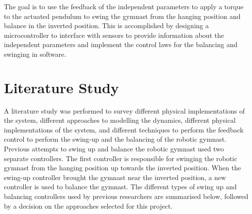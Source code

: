 The goal is to use the feedback of the independent parameters to apply a torque to the actuated pendulum to swing the gymnast from the hanging position and balance in the inverted position. This is accomplished by designing a microcontroller to interface with sensors to provide information about the independent parameters and implement the control laws for the balancing and swinging in software.\\


\section{Literature Study}
\label{sec:literature_study}

A literature study was performed to survey different physical implementations of the system, different approaches to modelling the dynamics, different physical implementations of the system, and different techniques to perform the feedback control to perform the swing-up and the balancing of the robotic gymnast.\\

Previous attempts to swing up and balance the robotic gymnast used two separate controllers. The first controller is responsible for swinging the robotic gymnast from the hanging position up towards the inverted position. When the swing-up controller brought the gymnast near the inverted position, a new controller is used to balance the gymnast. The different types of swing up and balancing controllers used by previous researchers are summarised below, followed by a decision on the approaches selected for this project.\\

